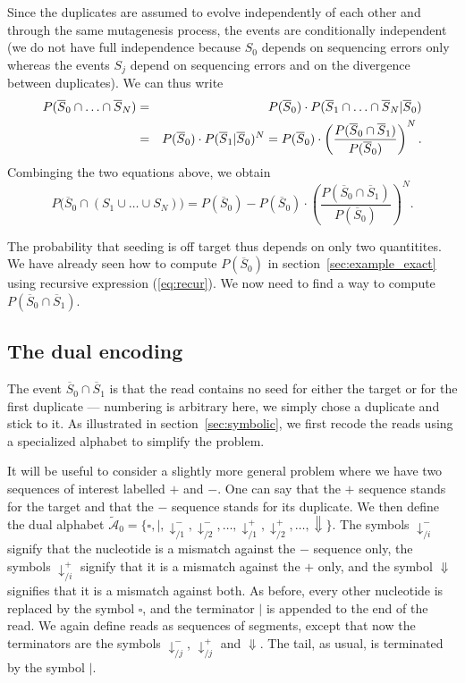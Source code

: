 \documentclass{article}
\begin{document}
Since the duplicates are assumed to evolve independently of each other and
through the same mutagenesis process, the events are conditionally
independent (we do not have full independence because $S_0$ depends on
sequencing errors only whereas the events $S_j$ depend on sequencing
errors and on the divergence between duplicates). We can thus write
\begin{eqnarray}
\notag
P(\overline{S}_0 \cap \ldots \cap \overline{S}_N) &=&
  P(\overline{S}_0) \cdot P(\overline{S}_1 \cap \ldots \cap
  \overline{S}_N | \overline{S}_0) \\
\label{eq:Pnull}
  &=& P(\overline{S}_0) \cdot P(\overline{S}_1 | \overline{S}_0)^N =
  P(\overline{S}_0) \cdot \left( \frac{P(\overline{S}_0 \cap
\overline{S}_1)}{P(\overline{S}_0)} \right)^N.
\end{eqnarray}
Combinging the two equations above, we obtain
\begin{equation}
\label{eq:Poff}
P\big(\overline{S}_0 \cap (S_1 \cup \ldots \cup S_N)\big) =
P(\overline{S}_0) - P(\overline{S}_0) \cdot \left( \frac{P(\overline{S}_0
\cap \overline{S}_1)}{P(\overline{S}_0)} \right)^N.
\end{equation}

The probability that seeding is off target thus depends on only two
quantitites. We have already seen how to compute $P(\overline{S}_0)$ in
section~\ref{sec:example_exact} using recursive expression
(\ref{eq:recur}). We now need to find a way to compute $P(\overline{S}_0
\cap \overline{S}_1)$.

\subsection{The dual encoding}
\label{sec:dual}

The event $\overline{S}_0 \cap \overline{S}_1$ is that the read contains
no seed for either the target or for the first duplicate --- numbering is
arbitrary here, we simply chose a duplicate and stick to it. As
illustrated in section~\ref{sec:symbolic}, we first recode the reads using
a specialized alphabet to simplify the problem.

It will be useful to consider a slightly more general problem where we
have two sequences of interest labelled $+$ and $-$. One can say that the
$+$ sequence stands for the target and that the $-$ sequence stands for
its duplicate. We then define the dual alphabet $\tilde{\mathcal{A}}_0 =
\{\square, |, \downarrow_{/1}^-, \downarrow_{/2}^-, \ldots,
\downarrow_{/1}^+, \downarrow_{/2}^+, \ldots, \Downarrow\}$. The symbols
$\downarrow_{/i}^-$ signify that the nucleotide is a mismatch against the
$-$ sequence only, the symbols $\downarrow_{/i}^+$ signify that it is a
mismatch against the $+$ only, and the symbol $\Downarrow$ signifies that
it is a mismatch against both. As before, every other nucleotide is
replaced by the symbol $\square$, and the terminator $|$ is appended to
the end of the read. We again define reads as sequences of segments,
except that now the terminators are the symbols $\downarrow_{/j}^-$,
$\downarrow_{/j}^+$ and $\Downarrow$. The tail, as usual, is terminated by
the symbol $|$.
\end{document}
